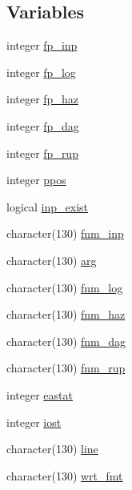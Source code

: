 \subsection*{Variables}
\begin{DoxyCompactItemize}
\item 
integer \hyperlink{namespaceinput__module_a7d1f1dd6198e0770d9218a80115df0de}{fp\+\_\+inp}
\item 
integer \hyperlink{namespaceinput__module_a24121f5e413cdf763ada92cb0c916ba3}{fp\+\_\+log}
\item 
integer \hyperlink{namespaceinput__module_a5b74d4c157160f6d6eaef2c725b02d6a}{fp\+\_\+haz}
\item 
integer \hyperlink{namespaceinput__module_a52ffef6eb6299a12612cc0b2eb5352dc}{fp\+\_\+dag}
\item 
integer \hyperlink{namespaceinput__module_a73158a89ce75123f19e014408bb9b342}{fp\+\_\+rup}
\item 
integer \hyperlink{namespaceinput__module_a34271f9a9a4c0c0d531db4d9e2b05fc3}{ppos}
\item 
logical \hyperlink{namespaceinput__module_af09923ed6808263d4497c13126abdb46}{inp\+\_\+exist}
\item 
character(130) \hyperlink{namespaceinput__module_ad228ac099c1afd318803f2d8514dd2c9}{fnm\+\_\+inp}
\item 
character(130) \hyperlink{namespaceinput__module_a7f573d3c228f74f193a801e6cb1175ef}{arg}
\item 
character(130) \hyperlink{namespaceinput__module_a95df80960079d35b95016b2448da8dcc}{fnm\+\_\+log}
\item 
character(130) \hyperlink{namespaceinput__module_ab37b626c8a9c8a0ad42d001c9a0e5ac4}{fnm\+\_\+haz}
\item 
character(130) \hyperlink{namespaceinput__module_ae99c24908c83beaac79f68a46d079e37}{fnm\+\_\+dag}
\item 
character(130) \hyperlink{namespaceinput__module_a913978d3f2a95df35b24c099c6599cd0}{fnm\+\_\+rup}
\item 
integer \hyperlink{namespaceinput__module_ada333752feb1551085c3d0331da41a6d}{eastat}
\item 
integer \hyperlink{namespaceinput__module_a865cd5e2924fbc40aeefe8bcb6226a75}{iost}
\item 
character(130) \hyperlink{namespaceinput__module_a304ebe11a9b47adcaeb6db5be6bae12d}{line}
\item 
character(130) \hyperlink{namespaceinput__module_ae257590e746cae45e031d04017cf76d1}{wrt\+\_\+fmt}

\end{DoxyCompactItemize}
